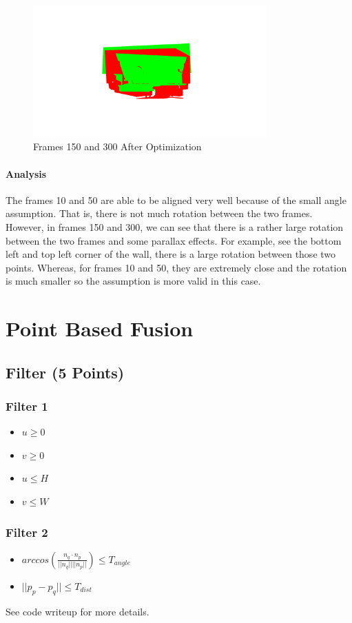 \documentclass[12pt, a4paper]{article}
\begin{document}
\begin{figure}[!htb]
    \centering
    \includegraphics[width=0.8\textwidth]{150_300_After.png}
    \caption{Frames 150 and 300 After Optimization}
\end{figure}
\paragraph{Analysis}
The frames 10 and 50 are able to be aligned very well because of the small angle assumption. That is, there is not much rotation between the two frames. However, in frames 150 and 300, we can see that there is a rather large rotation between the two frames and some parallax effects. For example, see the bottom left and top left corner of the wall, there is a large rotation between those two points. Whereas, for frames 10 and 50, they are extremely close and the rotation is much smaller so the assumption is more valid in this case.

\section{Point Based Fusion}
\subsection{Filter (5 Points)}

\subsubsection{Filter 1}
\begin{itemize}
    \item $u \geq 0$
    \item $v \geq 0$
    \item $u \le H$
    \item $v \le W$
\end{itemize}

\subsubsection{Filter 2}
\begin{itemize}
    \item $arccos(\frac{n_q \cdot n_p}{\vert \vert n_q \vert \vert \vert \vert n_p \vert \vert}) \le T_{angle}$
    \item $\vert \vert p_p - p_q \vert \vert \le T_{dist}$
\end{itemize}
See code writeup for more details.
\end{document}
